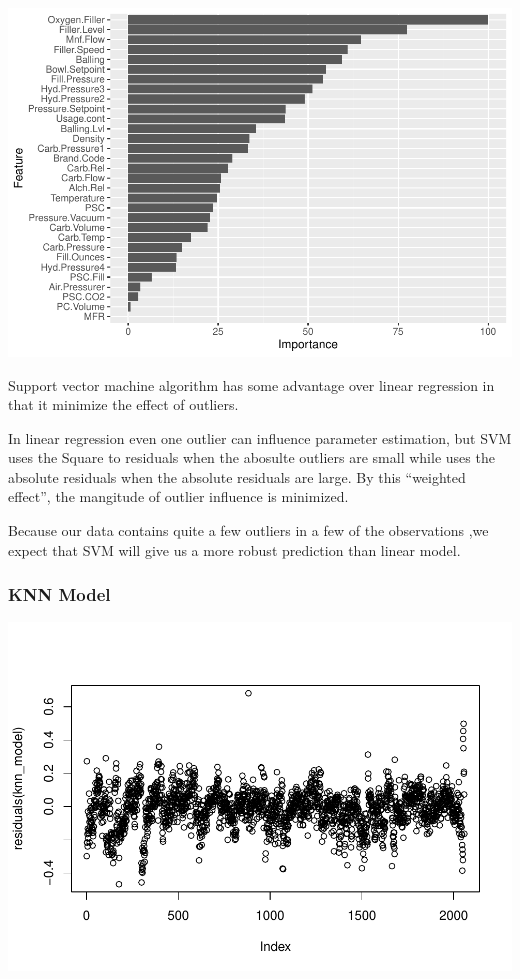 \documentclass[]{article}
\begin{document}
\begin{center}\includegraphics{OmerOzeren_GracieHan_Project_2_files/figure-latex/unnamed-chunk-19-1} \end{center}

Support vector machine algorithm has some advantage over linear
regression in that it minimize the effect of outliers.

In linear regression even one outlier can influence parameter
estimation, but SVM uses the Square to residuals when the abosulte
outliers are small while uses the absolute residuals when the absolute
residuals are large. By this ``weighted effect'', the mangitude of
outlier influence is minimized.

Because our data contains quite a few outliers in a few of the
observations ,we expect that SVM will give us a more robust prediction
than linear model.

\subsubsection{KNN Model}\label{knn-model}

\begin{center}\includegraphics{OmerOzeren_GracieHan_Project_2_files/figure-latex/unnamed-chunk-20-1} \end{center}
\end{document}
